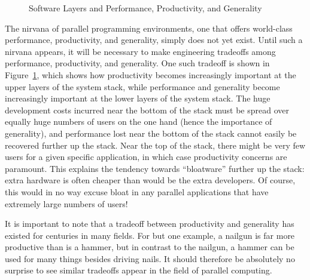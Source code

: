 \begin{figure}[tb]
\begin{center}
\end{center}
\caption{Software Layers and Performance, Productivity, and Generality}
\label{fig:intro:Software Layers and Performance, Productivity, and Generality}
\end{figure}

The nirvana of parallel programming environments, one that offers
world-class performance, productivity, and generality, simply does
not yet exist.
Until such a nirvana appears, it will be necessary to make engineering
tradeoffs among performance, productivity, and generality.
One such tradeoff is shown in
Figure~\ref{fig:intro:Software Layers and Performance, Productivity, and Generality},
which shows how productivity becomes increasingly important at the upper layers
of the system stack,
while performance and generality become increasingly important at the
lower layers of the system stack.
The huge development costs incurred near the bottom of the stack
must be spread over equally huge numbers of users on the one hand
(hence the importance of generality), and
performance lost near the bottom of the stack cannot easily be
recovered further up the stack.
Near the top of the stack, there might be very few users for a given
specific application, in which case productivity concerns are paramount.
This explains the tendency towards ``bloatware'' further up the stack:
extra hardware is often cheaper than would be the extra developers.
Of course, this would in no way excuse bloat in any parallel applications
that have extremely large numbers of users!

It is important to note that a tradeoff between productivity and
generality has existed for centuries in many fields.
For but one example, a nailgun is far more productive than is a
hammer, but in contrast to the nailgun, a hammer can be used for
many things besides driving nails.
It should therefore be absolutely no surprise to see similar tradeoffs
appear in the field of parallel computing.

